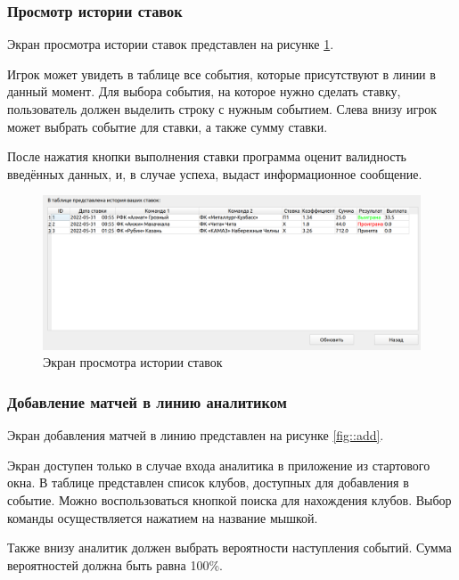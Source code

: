 \subsubsection{Просмотр истории ставок}
Экран просмотра истории ставок представлен на рисунке \ref{fig::history}.

Игрок может увидеть в таблице все события, которые присутствуют в линии в данный момент.
Для выбора события, на которое нужно сделать ставку, пользователь должен выделить строку с нужным событием.
Слева внизу игрок может выбрать событие для ставки, а также сумму ставки.

После нажатия кнопки выполнения ставки программа оценит валидность введённых данных, и, в случае успеха, выдаст информационное сообщение.

\FloatBarrier
\begin{figure}[h]	
	\begin{center}
		\includegraphics[width=\linewidth]{inc/history.png}
	\end{center}
	\caption{Экран просмотра истории ставок}
	\label{fig::history}
\end{figure}
\FloatBarrier

\subsubsection{Добавление матчей в линию аналитиком}
Экран добавления матчей в линию представлен на рисунке \ref{fig::add}.

Экран доступен только в случае входа аналитика в приложение из стартового окна.
В таблице представлен список клубов, доступных для добавления в событие.
Можно воспользоваться кнопкой поиска для нахождения клубов.
Выбор команды осуществляется нажатием на название мышкой.

Также внизу аналитик должен выбрать вероятности наступления событий. 
Сумма вероятностей должна быть равна 100\%.

